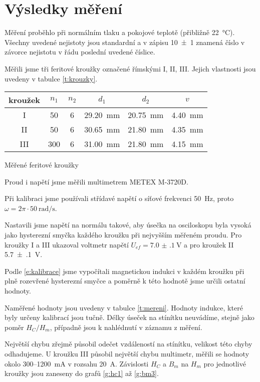 \section*{Výsledky měření}
Měření proběhlo při normálním tlaku a pokojové teplotě (přibližně \SI{22}{\degreeCelsius}).
Všechny uvedené nejistoty jsou standardní a v zápisu \num{10(1)} znamená číslo v závorce nejistotu v řádu poslední uvedené číslice.

Měřili jsme tři feritové kroužky označené římskými I, II, III.
Jejich vlastnosti jsou uvedeny v tabulce \ref{t:krouzky}.

\begin{tabulka}[htbp]
\centering
\begin{tabular}{c|c|c|c|c|c}
kroužek & $n_1$ & $n_2$ & $d_1$ & $d_2$ & $v$ \\ \hline
I & \num{50} & \num{6} & \SI{29.20}{\mm} & \SI{20.75}{\mm} & \SI{4.40}{\mm} \\
II & \num{50} & \num{6} & \SI{30.65}{\mm} & \SI{21.80}{\mm} & \SI{4.35}{\mm} \\
III & \num{300} & \num{6} & \SI{31.00}{\mm} & \SI{21.80}{\mm} & \SI{4.15}{\mm} \\
\end{tabular}
\caption{Měřené feritové kroužky}
\label{t:krouzky}
\end{tabulka}

Proud i napětí jsme měřili multimetrem METEX M-3720D.

Při kalibraci jsme používali střídavé napětí o síťové frekvenci \SI{50}{\hertz}, proto $\omega = 2\pi\cdot\SI{50}{\radian\per\second}$.

Nastavili jsme napětí na normálu takové, aby úsečka na osciloskopu byla vysoká jako hysterezní smyčka každého kroužku při nejvyšším měřeném proudu.
Pro kroužky I a III ukazoval voltmetr napětí $U_{ef} = \SI{7.0(1)}{\volt}$ a pro kroužek II \SI{5.7(1)}{\volt}.

Podle \eqref{e:kalibrace} jsme vypočítali magnetickou indukci v každém kroužku při plně rozevřené hysterezní smyčce a poměrně k této hodnotě jsme určili ostatní hodnoty.

Naměřené hodnoty jsou uvedeny v tabulce \ref{t:mereni}.
Hodnoty indukce, které byly určeny kalibrací jsou tučně.
Délky úseček na stínítku neuvádíme, stejně jako poměr $H_C/H_m$, případně jsou k nahlédnutí v záznamu z měření.

Největší chybu zřejmě působil odečet vzdáleností na stínítku, velikost této chyby odhadujeme.
U kroužku III působil největší chybu multimetr, měřili se hodnoty okolo 300--\SI{1200}{\milli\ampere} v rozsahu \SI{20}{\ampere}.
Závislosti $H_C$ a $B_m$ na $H_m$ pro jednotlivé kroužky jsou zaneseny do grafů \ref{g:hc1} až \ref{g:bm3}.

